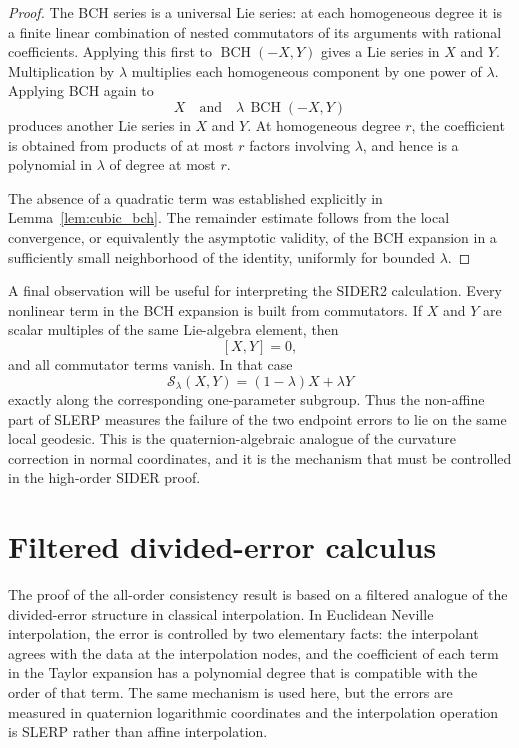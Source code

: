 \documentclass[a4paper,11pt]{article}
\newcommand{\BCH}{\operatorname{BCH}}
\numberwithin{equation}{section}
\theoremstyle{plain}
\theoremstyle{definition}
\theoremstyle{remark}
\begin{document}
\begin{proof}
The BCH series is a universal Lie series: at each homogeneous degree it is a
finite linear combination of nested commutators of its arguments with rational
coefficients.  Applying this first to \(\BCH(-X,Y)\) gives a Lie series in
\(X\) and \(Y\).  Multiplication by \(\lambda\) multiplies each homogeneous
component by one power of \(\lambda\).  Applying BCH again to
\[
        X
        \quad\text{and}\quad
        \lambda\,\BCH(-X,Y)
\]
produces another Lie series in \(X\) and \(Y\).  At homogeneous degree \(r\),
the coefficient is obtained from products of at most \(r\) factors involving
\(\lambda\), and hence is a polynomial in \(\lambda\) of degree at most \(r\).

The absence of a quadratic term was established explicitly in
Lemma~\ref{lem:cubic_bch}.  The remainder estimate follows from the local
convergence, or equivalently the asymptotic validity, of the BCH expansion in
a sufficiently small neighborhood of the identity, uniformly for bounded
\(\lambda\).
\end{proof}

A final observation will be useful for interpreting the SIDER2 calculation.
Every nonlinear term in the BCH expansion is built from commutators.  If
\(X\) and \(Y\) are scalar multiples of the same Lie-algebra element, then
\[
        [X,Y]=0,
\]
and all commutator terms vanish.  In that case
\[
        \mathcal S_\lambda(X,Y)=(1-\lambda)X+\lambda Y
\]
exactly along the corresponding one-parameter subgroup.  Thus the
non-affine part of SLERP measures the failure of the two endpoint errors to
lie on the same local geodesic.  This is the quaternion-algebraic analogue of
the curvature correction in normal coordinates, and it is the mechanism that
must be controlled in the high-order SIDER proof.

\section{Filtered divided-error calculus}
\label{sec:filtered_calculus}

The proof of the all-order consistency result is based on a filtered analogue
of the divided-error structure in classical interpolation.  In Euclidean
Neville interpolation, the error is controlled by two elementary facts: the
interpolant agrees with the data at the interpolation nodes, and the
coefficient of each term in the Taylor expansion has a polynomial degree that
is compatible with the order of that term.  The same mechanism is used here,
but the errors are measured in quaternion logarithmic coordinates and the
interpolation operation is SLERP rather than affine interpolation.
\end{document}
